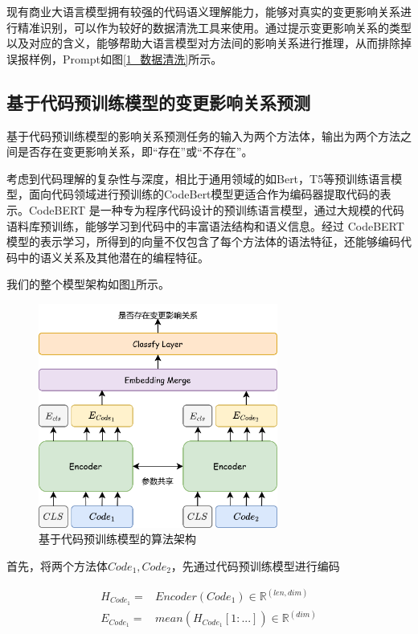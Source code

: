 现有商业大语言模型拥有较强的代码语义理解能力，能够对真实的变更影响关系进行精准识别，可以作为较好的数据清洗工具来使用。通过提示变更影响关系的类型以及对应的含义，能够帮助大语言模型对方法间的影响关系进行推理，从而排除掉误报样例，Prompt如图\ref{1_数据清洗}所示。


\subsection{基于代码预训练模型的变更影响关系预测}

基于代码预训练模型的影响关系预测任务的输入为两个方法体，输出为两个方法之间是否存在变更影响关系，即“存在”或“不存在”。

考虑到代码理解的复杂性与深度，相比于通用领域的如Bert，T5等预训练语言模型，面向代码领域进行预训练的CodeBert模型更适合作为编码器提取代码的表示。CodeBERT 是一种专为程序代码设计的预训练语言模型，通过大规模的代码语料库预训练，能够学习到代码中的丰富语法结构和语义信息。经过 CodeBERT 模型的表示学习，所得到的向量不仅包含了每个方法体的语法特征，还能够编码代码中的语义关系及其他潜在的编程特征。

我们的整个模型架构如图\ref{1_code_bert_overall}所示。
\vspace{0mm}
\begin{figure}[h]
\centering
\includegraphics[width = 0.70\textwidth]{figures/1_code_bert_overall.png}
\caption{基于代码预训练模型的算法架构}
\label{1_code_bert_overall}
\end{figure}


首先，将两个方法体$ Code_1, Code_2$，先通过代码预训练模型进行编码

\begin{align}
H_{Code_1}=&Encoder(Code_1) \in \mathbb{R}^{(len,dim)} \\
E_{Code_1}=&mean(H_{Code_1}[1:...]) \in \mathbb{R}^{(dim)}
\end{align}

